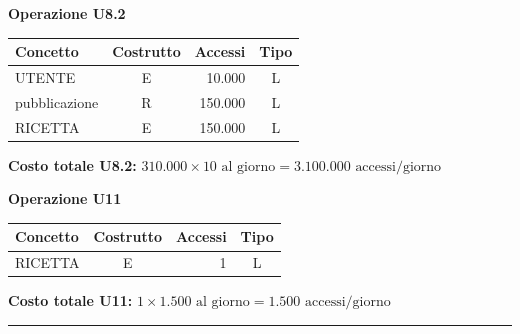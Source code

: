 \vspace{1.5em}

\noindent\textbf{Operazione U8.2}
\begin{table}[H]
\centering
\renewcommand{\arraystretch}{1.2}
\setlength{\tabcolsep}{8pt}
\begin{tabularx}{\textwidth}{|X|c|r|c|}
\hline
\textbf{Concetto} & \textbf{Costrutto} & \textbf{Accessi} & \textbf{Tipo} \\
\hline
UTENTE & E & 10.000 & L \\
\hline
pubblicazione & R & 150.000 & L \\
\hline
RICETTA & E & 150.000 & L \\
\hline
\end{tabularx}
\end{table}
\textbf{Costo totale U8.2:} $310.000 \times 10 \mbox{ al giorno} = 3.100.000 \mbox{ accessi/giorno}$

\vspace{1.5em}

\noindent\textbf{Operazione U11}
\begin{table}[H]
\centering
\renewcommand{\arraystretch}{1.2}
\setlength{\tabcolsep}{8pt}
\begin{tabularx}{\textwidth}{|X|c|r|c|}
\hline
\textbf{Concetto} & \textbf{Costrutto} & \textbf{Accessi} & \textbf{Tipo} \\
\hline
RICETTA & E & 1 & L \\
\hline
\end{tabularx}
\end{table}
\textbf{Costo totale U11:} $1 \times 1.500 \mbox{ al giorno} = 1.500 \mbox{ accessi/giorno}$

\vspace{1.5em}

\noindent{}

\vspace{2em}
\hrule
\vspace{2em}

